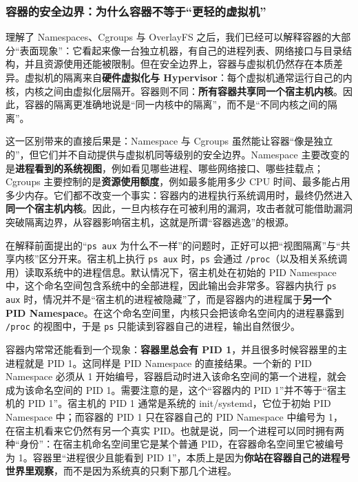 \subsubsection{容器的安全边界：为什么容器不等于“更轻的虚拟机”}

理解了 Namespaces、Cgroups 与 OverlayFS 之后，我们已经可以解释容器的大部分“表面现象”：它看起来像一台独立机器，有自己的进程列表、网络接口与目录结构，并且资源使用还能被限制。但在安全边界上，容器与虚拟机仍然存在本质差异。虚拟机的隔离来自\textbf{硬件虚拟化与 Hypervisor}：每个虚拟机通常运行自己的内核，内核之间由虚拟化层隔开。容器则不同：\textbf{所有容器共享同一个宿主机内核}。因此，容器的隔离更准确地说是“同一内核中的隔离”，而不是“不同内核之间的隔离”。

这一区别带来的直接后果是：Namespace 与 Cgroups 虽然能让容器“像是独立的”，但它们并不自动提供与虚拟机同等级别的安全边界。Namespace 主要改变的是\textbf{进程看到的系统视图}，例如看见哪些进程、哪些网络接口、哪些挂载点；Cgroups 主要控制的是\textbf{资源使用额度}，例如最多能用多少 CPU 时间、最多能占用多少内存。它们都不改变一个事实：容器内的进程执行系统调用时，最终仍然进入\textbf{同一个宿主机内核}。因此，一旦内核存在可被利用的漏洞，攻击者就可能借助漏洞突破隔离边界，从容器影响宿主机，这就是所谓“容器逃逸”的根源。

在解释前面提出的“\texttt{ps aux} 为什么不一样”的问题时，正好可以把“视图隔离”与“共享内核”区分开来。宿主机上执行 \texttt{ps aux} 时，\texttt{ps} 会通过 \texttt{/proc}（以及相关系统调用）读取系统中的进程信息。默认情况下，宿主机处在初始的 PID Namespace 中，这个命名空间包含系统中的全部进程，因此输出会非常多。容器内执行 \texttt{ps aux} 时，情况并不是“宿主机的进程被隐藏”了，而是容器内的进程属于\textbf{另一个 PID Namespace}。在这个命名空间里，内核只会把该命名空间内的进程暴露到 \texttt{/proc} 的视图中，于是 \texttt{ps} 只能读到容器自己的进程，输出自然很少。

容器内常常还能看到一个现象：\textbf{容器里总会有 PID 1}，并且很多时候容器里的主进程就是 PID 1。这同样是 PID Namespace 的直接结果。一个新的 PID Namespace 必须从 1 开始编号，容器启动时进入该命名空间的第一个进程，就会成为该命名空间的 PID 1。需要注意的是，这个“容器内的 PID 1”并不等于“宿主机的 PID 1”。宿主机的 PID 1 通常是系统的 init/systemd，它位于初始 PID Namespace 中；而容器的 PID 1 只在容器自己的 PID Namespace 中编号为 1，在宿主机看来它仍然有另一个真实 PID。也就是说，同一个进程可以同时拥有两种“身份”：在宿主机命名空间里它是某个普通 PID，在容器命名空间里它被编号为 1。容器里“进程很少且能看到 PID 1”，本质上是因为\textbf{你站在容器自己的进程号世界里观察}，而不是因为系统真的只剩下那几个进程。

